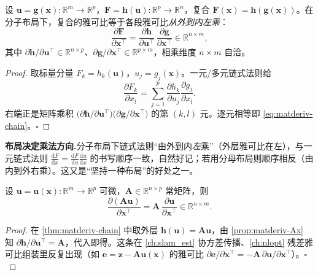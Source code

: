 \begin{theorem}[向量复合的链式法则]\label{thm:matderiv-chain}
设 $\mathbf{u}=\mathbf{g}(\mathbf{x}):\mathbb{R}^m\to\mathbb{R}^p$，$\mathbf{F}=\mathbf{h}(\mathbf{u}):\mathbb{R}^p\to\mathbb{R}^n$，复合 $\mathbf{F}(\mathbf{x})=\mathbf{h}(\mathbf{g}(\mathbf{x}))$。在分子布局下，复合的雅可比等于各段雅可比\emph{从外到内左乘}：
\begin{equation}
  \frac{\partial\mathbf{F}}{\partial\mathbf{x}^\top}
  =\frac{\partial\mathbf{h}}{\partial\mathbf{u}^\top}\,\frac{\partial\mathbf{g}}{\partial\mathbf{x}^\top}
  \in\mathbb{R}^{n\times m},
  \label{eq:matderiv-chain}
\end{equation}
其中 $\partial\mathbf{h}/\partial\mathbf{u}^\top\in\mathbb{R}^{n\times p}$、$\partial\mathbf{g}/\partial\mathbf{x}^\top\in\mathbb{R}^{p\times m}$，相乘维度 $n\times m$ 自洽。
\end{theorem}
\begin{proof}
取标量分量 $F_k=h_k(\mathbf{u})$，$u_j=g_j(\mathbf{x})$。一元/多元链式法则给
\begin{equation*}
  \frac{\partial F_k}{\partial x_l}=\sum_{j=1}^{p}\frac{\partial h_k}{\partial u_j}\frac{\partial g_j}{\partial x_l}.
\end{equation*}
右端正是矩阵乘积 $\big(\partial\mathbf{h}/\partial\mathbf{u}^\top\big)\big(\partial\mathbf{g}/\partial\mathbf{x}^\top\big)$ 的第 $(k,l)$ 元。逐元相等即 \cref{eq:matderiv-chain}。\hfill$\square$
\end{proof}

\begin{note}
\textbf{布局决定乘法方向.}\;分子布局下链式法则“由外到内\emph{左}乘”（外层雅可比在左），与一元链式法则 $\tfrac{\mathrm{d}F}{\mathrm{d}x}=\tfrac{\mathrm{d}F}{\mathrm{d}u}\tfrac{\mathrm{d}u}{\mathrm{d}x}$ 的书写顺序一致，自然好记；若用分母布局则顺序相反（由内到外右乘）。这又是“坚持一种布局”的好处之一。
\end{note}

\begin{corollary}\label{cor:matderiv-Au}
设 $\mathbf{u}=\mathbf{u}(\mathbf{x}):\mathbb{R}^m\to\mathbb{R}^p$ 可微，$\mathbf{A}\in\mathbb{R}^{n\times p}$ 常矩阵，则
\begin{equation}
  \frac{\partial(\mathbf{A}\mathbf{u})}{\partial\mathbf{x}^\top}
  =\mathbf{A}\,\frac{\partial\mathbf{u}}{\partial\mathbf{x}^\top}\in\mathbb{R}^{n\times m}.
  \label{eq:matderiv-Au}
\end{equation}
\end{corollary}
\begin{proof}
在 \cref{thm:matderiv-chain} 中取外层 $\mathbf{h}(\mathbf{u})=\mathbf{A}\mathbf{u}$，由 \cref{prop:matderiv-Ax} 知 $\partial\mathbf{h}/\partial\mathbf{u}^\top=\mathbf{A}$，代入即得。这条在 \cref{ch:slam_est} 协方差传播、\cref{ch:nlopt} 残差雅可比组装里反复出现（如 $\mathbf{e}=\mathbf{z}-\mathbf{A}\mathbf{u}(\mathbf{x})$ 的雅可比 $\partial\mathbf{e}/\partial\mathbf{x}^\top=-\mathbf{A}\,\partial\mathbf{u}/\partial\mathbf{x}^\top$）。\hfill$\square$
\end{proof}

